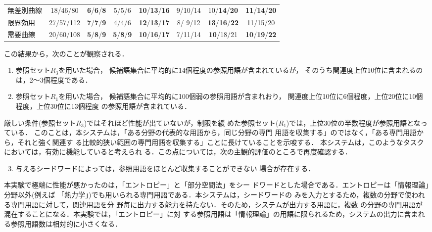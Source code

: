 \begin{table}
\begin{center}
\begin{tabular}{|l|c||cc|cc|cc|}
   無差別曲線 & 18/46/80 & {\bf 6}/{\bf 6}/{\bf 8} & 5/5/6 & {\bf 10}/{\bf 13}/{\bf 16} & 9/10/14 & 10/{\bf 14}/{\bf 20} & {\bf 11}/{\bf 14}/{\bf 20} \\ 
   限界効用 & 27/57/112 & {\bf 7}/{\bf 7}/{\bf 9} & 4/4/6 & {\bf 12}/{\bf 13}/{\bf 17} & 8/ 9/12 & {\bf 13}/{\bf 16}/{\bf 22} & 11/15/20 \\ 
   需要曲線 & 20/60/108 & {\bf 5}/{\bf 8}/{\bf 9} & {\bf 5}/{\bf 8}/{\bf 9} & {\bf 10}/{\bf 16}/{\bf 17} & 7/11/14 & {\bf 10}/18/21 & {\bf 10}/{\bf 19}/{\bf 22} \\ 
   \hline
  \end{tabular}
 \end{center}
\end{table}

この結果から，次のことが観察される．
\begin{enumerate}
\item 
参照セット$R_3$を用いた場合，
候補語集合に平均的に14個程度の参照用語が含まれているが，
そのうち関連度上位10位に含まれるのは，2〜3個程度である．
\item 
参照セット$R_1$を用いた場合，
候補語集合に平均的に100個弱の参照用語が含まれおり，
関連度上位10位に6個程度，上位20位に10個程度，上位30位に13個程度
の参照用語が含まれている．
\end{enumerate}

厳しい条件(参照セット$R_3$)ではそれほど性能が出ていないが，制限を緩
めた参照セット($R_1$)では，上位30位の半数程度が参照用語となっている．
このことは，本システムは，「ある分野の代表的な用語から，同じ分野の専門
用語を収集する」のではなく，「ある専門用語から，それと強く関連す
る比較的狭い範囲の専門用語を収集する」ことに長けていることを示唆する．
本システムは，このようなタスクにおいては，有効に機能していると考えられ
る．この点については，次の主観的評価のところで再度確認する．

\begin{enumerate} \setcounter{enumi}{2}
\item 
与えるシードワードによっては，参照用語をほとんど収集することができない
場合が存在する．
\end{enumerate}

本実験で極端に性能が悪かったのは，「エントロピー」と「部分空間法」をシー
ドワードとした場合である．エントロピーは「情報理論」分野以外(例えば
「熱力学」)でも用いられる専門用語である．本システムは，シードワードの
みを入力とするため，複数の分野で使われる専門用語に対して，関連用語を分
野毎に出力する能力を持たない．そのため，システムが出力する用語に，複数
の分野の専門用語が混在することになる．本実験では，「エントロピー」に対
する参照用語は「情報理論」の用語に限られるため，システムの出力に含まれ
る参照用語数は相対的に小さくなる．

